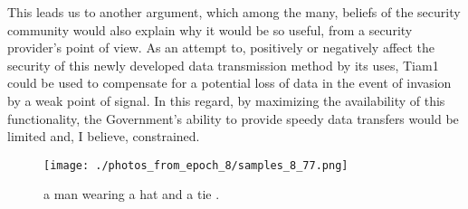 \documentclass{article}%
\begin{document}
This leads us to another argument, which among the many, beliefs of the security community would also explain why it would be so useful, from a security provider's point of view.\newline%
As an attempt to, positively or negatively affect the security of this newly developed data transmission method by its uses, Tiam1 could be used to compensate for a potential loss of data in the event of invasion by a weak point of signal.\newline%
In this regard, by maximizing the availability of this functionality, the Government's ability to provide speedy data transfers would be limited and, I believe, constrained.\newline%

%


\begin{figure}[h!]%
\centering%
\texttt{[image: ./photos\_from\_epoch\_8/samples\_8\_77.png]}%
\caption{a man wearing a hat and a tie .}%
\end{figure}

%
\end{document}

